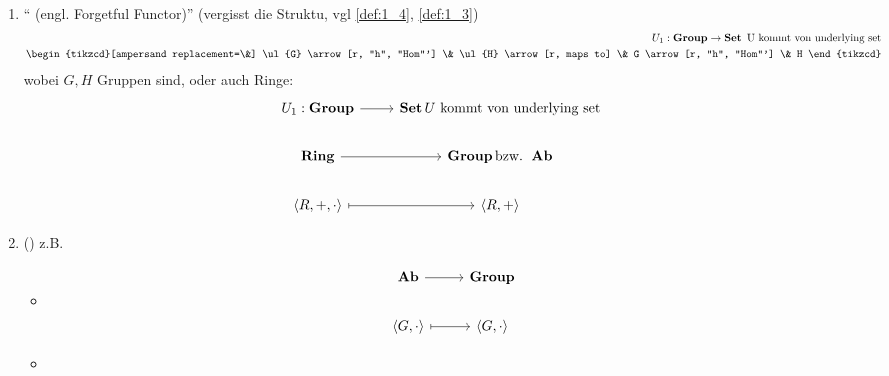\begin{beispiel}
	\begin{enumerate}
		\item `` (engl. Forgetful Functor)'' (vergisst die Struktu, vgl \ref{def:1_4}, \ref{def:1_3})
		\begin{align*}
			U_1: \Group \to \Set \text{ U kommt von underlying set}\\
			\begin{tikzcd}[ampersand replacement=\&]
			\ul{G} \arrow[r, "h", "Hom"'] \& \ul{H} \arrow[r, maps to] \& G \arrow[r, "h", "Hom"'] \& H
			\end{tikzcd}
		\end{align*}
		wobei $G,H$ Gruppen sind, oder auch Ringe:
		\begin{align*} %
			\begin{tikzcd}[ampersand replacement=\&]
			U_1: \Group \arrow[r] \& \Set U\text{ kommt von underlying set}\\
			\Ring \arrow[r] \& \Group \text{bzw. } \Ab\\
			\langle R, + , \cdot\rangle \arrow[r, maps to] \& \langle R, + \rangle
			\end{tikzcd}
		\end{align*}
		\item {} ()
		z.B.
		\begin{itemize}
			\item 
			\begin{align*}
				\begin{tikzcd}[ampersand replacement=\&]
				\Ab \arrow[r]                                 \& \Group                     \\
				{\langle G, \cdot \rangle} \arrow[r, maps to] \& {\langle G, \cdot \rangle}
				\end{tikzcd}
			\end{align*}
			\item 

\end{itemize}
\end{enumerate}
\end{beispiel}

